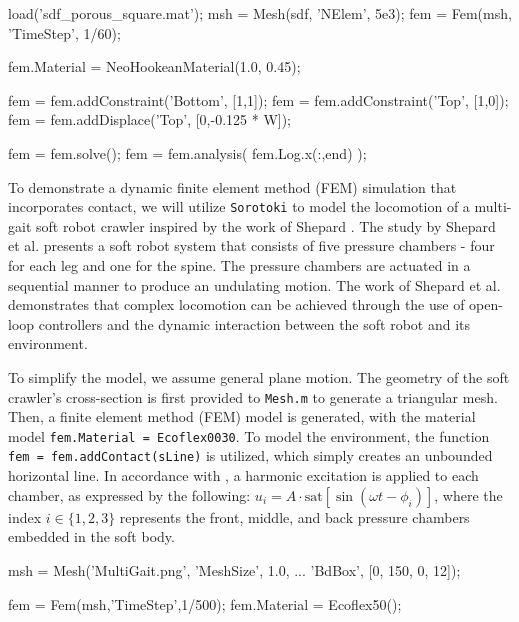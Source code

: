 \begin{matlabcode}
load('sdf_porous_square.mat');
msh = Mesh(sdf, 'NElem', 5e3);
fem = Fem(msh, 'TimeStep', 1/60);

fem.Material = NeoHookeanMaterial(1.0, 0.45);

fem = fem.addConstraint('Bottom', [1,1]);
fem = fem.addConstraint('Top', [1,0]);
fem = fem.addDisplace('Top', [0,-0.125 * W]);

fem = fem.solve();
fem = fem.analysis( fem.Log.x(:,end) );
\end{matlabcode}
    

\begin{example}
To demonstrate a dynamic finite element method (FEM) simulation that incorporates contact, we will utilize \texttt{Sorotoki} to model the locomotion of a multi-gait soft robot crawler inspired by the work of Shepard \cite{Shepherd2011Dec}. The study by Shepard  et al. \cite{Shepherd2011Dec} presents a soft robot system that consists of five pressure chambers - four for each leg and one for the spine. The pressure chambers are actuated in a sequential manner to produce an undulating motion. The work of Shepard  et al. \cite{Shepherd2011Dec} demonstrates that complex locomotion can be achieved through the use of open-loop controllers and the dynamic interaction between the soft robot and its environment.

To simplify the model, we assume general plane motion. The geometry of the soft crawler's cross-section is first provided to \texttt{Mesh.m} to generate a triangular mesh. Then, a finite element method (FEM) model is generated, with the material model \texttt{fem.Material = Ecoflex0030}. To model the environment, the function \texttt{fem = fem.addContact(sLine)} is utilized, which simply creates an unbounded horizontal line. In accordance with \cite{Shepherd2011Dec}, a harmonic excitation is applied to each chamber, as expressed by the following: $u_i = A\cdot\textrm{sat}\left[\sin(\omega t - \phi_i) \right]$, where the index $i \in \{1,2,3\}$ represents the front, middle, and back pressure chambers embedded in the soft body. 

\begin{matlabcode} 
msh = Mesh('MultiGait.png', 'MeshSize', 1.0, ...
            'BdBox', [0, 150, 0, 12]);

fem = Fem(msh,'TimeStep',1/500);
fem.Material = Ecoflex50();


\end{matlabcode}
\end{example}
